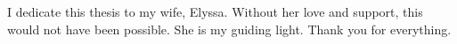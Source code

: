 I dedicate this thesis to my wife, Elyssa. Without her love and support, this would not have been possible. She is my guiding light. Thank you for everything.
